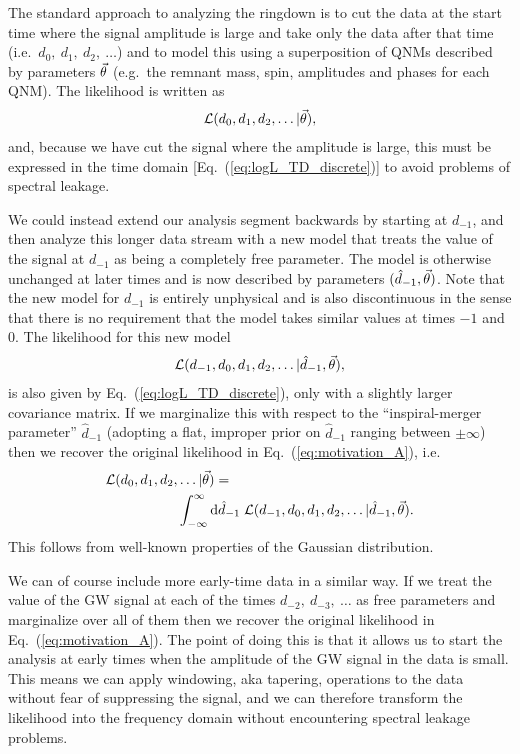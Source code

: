The standard approach to analyzing the ringdown is to cut the data at the start time where the signal amplitude is large and take only the data after that time (i.e.\ $d_{0},\ d_{1},\ d_{2},\ \ldots$) and to model this using a superposition of QNMs described by parameters $\vec{\theta}$ (e.g.\ the remnant mass, spin, amplitudes and phases for each QNM).
The likelihood is written as
\begin{align} \label{eq:motivation_A}
	\mathcal{L}(d_{0}, d_{1}, d_{2}, \ldots|\vec{\theta}),
\end{align}
and, because we have cut the signal where the amplitude is large, this must be expressed in the time domain [Eq.~(\ref{eq:logL_TD_discrete})] to avoid problems of spectral leakage.

We could instead extend our analysis segment backwards by starting at $d_{-1}$, and then analyze this longer data stream with a new model that treats the value of the signal at $d_{-1}$ as being a completely free parameter. 
The model is otherwise unchanged at later times and is now described by parameters $(\hat{d}_{-1}, \vec{\theta})$.
Note that the new model for $d_{-1}$ is entirely unphysical and is also discontinuous in the sense that there is no requirement that the model takes similar values at times $-1$ and 0.
The likelihood for this new model
\begin{align} \label{eq:motivation_B}
	\mathcal{L}(d_{-1}, d_{0}, d_{1}, d_{2}, \ldots|\hat{d}_{-1}, \vec{\theta}),
\end{align} 
is also given by Eq.~(\ref{eq:logL_TD_discrete}), only with a slightly larger covariance matrix.
If we marginalize this with respect to the ``inspiral-merger parameter'' $\hat{d}_{-1}$ 
(adopting a flat, improper prior on $\hat{d}_{-1}$ ranging between $\pm\infty$)
then we recover the original likelihood in Eq.~(\ref{eq:motivation_A}), i.e.\
\begin{align} \label{eq:motivation_C}
	\mathcal{L}(d_{0}, d_{1}, d_{2}, &\ldots|\vec{\theta}) = \\ &\int_{-\infty}^{\infty} \mathrm{d}\hat{d}_{-1}\; \mathcal{L}(d_{-1}, d_{0}, d_{1}, d_{2}, \ldots|\hat{d}_{-1}, \vec{\theta}). \nonumber
\end{align}
This follows from well-known properties of the Gaussian distribution.

We can of course include more early-time data in a similar way. 
If we treat the value of the GW signal at each of the times $d_{-2},\ d_{-3},\ \ldots$ as free parameters and marginalize over all of them then we recover the original likelihood in Eq.~(\ref{eq:motivation_A}).
The point of doing this is that it allows us to start the analysis at early times when the amplitude of the GW signal in the data is small.
This means we can apply windowing, aka tapering, operations to the data without fear of suppressing the signal, and we can therefore transform the likelihood into the frequency domain without encountering spectral leakage problems.

